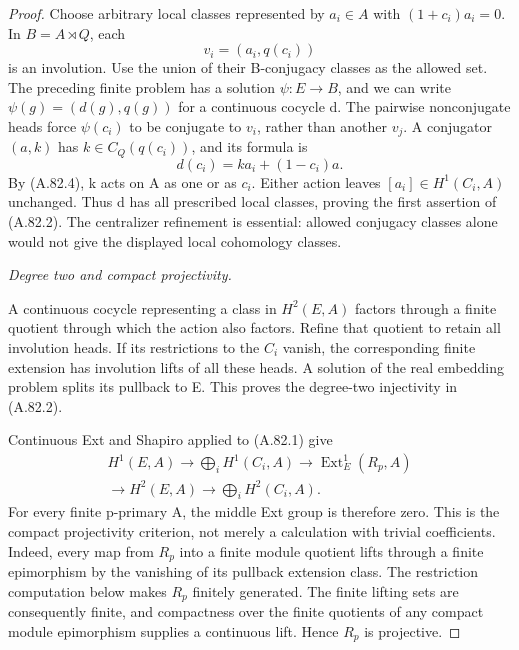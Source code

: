 \begin{proof}
Choose arbitrary local classes represented by
\(a_i\in A\) with \((1+c_i)a_i=0\). In
\(B=A\rtimes Q\), each
\[
                            v_i=(a_i,q(c_i))
\]
is an involution. Use the union of their B-conjugacy classes
as the allowed set. The preceding finite problem has a
solution \(\psi:E\to B\), and we can write
\(\psi(g)=(d(g),q(g))\) for a continuous cocycle d.
The pairwise nonconjugate heads force \(\psi(c_i)\)
to be conjugate to \(v_i\), rather than another
\(v_j\). A conjugator \((a,k)\) has
\(k\in C_Q(q(c_i))\), and its formula is
\[
                         d(c_i)=ka_i+(1-c_i)a.
 \tag{A.82.5}
\]
By (A.82.4), k acts on A as one or as \(c_i\).
Either action leaves \([a_i]\in H^1(C_i,A)\)
unchanged. Thus d has all prescribed local classes,
proving the first assertion of (A.82.2). The centralizer
refinement is essential: allowed conjugacy classes alone
would not give the displayed local cohomology classes.

\emph{Degree two and compact projectivity.}\par
A continuous cocycle representing a class in \(H^2(E,A)\)
factors through a finite quotient through which the action
also factors. Refine that quotient to retain all involution
heads. If its restrictions to the \(C_i\) vanish, the
corresponding finite extension has involution lifts of all
these heads. A solution of the real embedding problem
splits its pullback to E. This proves the degree-two
injectivity in (A.82.2).

Continuous Ext and Shapiro applied to (A.82.1) give
\[
 \begin{gathered}
 H^1(E,A)\longrightarrow\bigoplus_iH^1(C_i,A)
       \longrightarrow\operatorname{Ext}^1_E(R_p,A)\\
       \longrightarrow H^2(E,A)
       \longrightarrow\bigoplus_iH^2(C_i,A).
 \end{gathered}
 \tag{A.82.6}
\]
For every finite p-primary A, the middle Ext group is
therefore zero. This is the compact projectivity criterion,
not merely a calculation with trivial coefficients. Indeed,
every map from \(R_p\) into a finite module quotient
lifts through a finite epimorphism by the vanishing of its
pullback extension class. The restriction computation below
makes \(R_p\) finitely generated. The finite lifting sets
are consequently finite, and compactness over the finite
quotients of any compact module epimorphism supplies a
continuous lift. Hence \(R_p\) is projective.


\end{proof}
